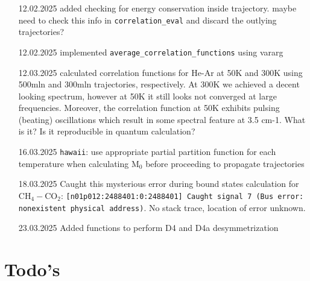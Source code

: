 \documentclass{article}
\begin{document}
\begin{enumerate}
    \item [12.02.2025] added checking for energy conservation inside trajectory. {\color{red} maybe need to check this info in \texttt{correlation\_eval} and discard the outlying trajectories?}
    \item [12.02.2025] implemented \texttt{average\_correlation\_functions} using vararg
    \item [12.03.2025] calculated correlation functions for He-Ar at 50K and 300K using 500mln and 300mln trajectories, respectively. At 300K we achieved a decent looking spectrum, however at 50K it still looks not converged at large frequencies. Moreover, the correlation function at 50K exhibits pulsing (beating) oscillations which result in some spectral feature at 3.5 cm-1. What is it? Is it reproducible in quantum calculation?
    \item [16.03.2025] \texttt{hawaii}: use appropriate partial partition function for each temperature when calculating M$_0$ before proceeding to propagate trajectories
    \item [18.03.2025] Caught this mysterious error during bound states calculation for CH$_4-$CO$_2$: \texttt{[n01p012:2488401:0:2488401] Caught signal 7 (Bus error: nonexistent physical address)}. No stack trace, location of error unknown.
    \item [23.03.2025] Added functions to perform D4 and D4a desymmetrization
\end{enumerate}

\section{Todo's}
\end{document}
